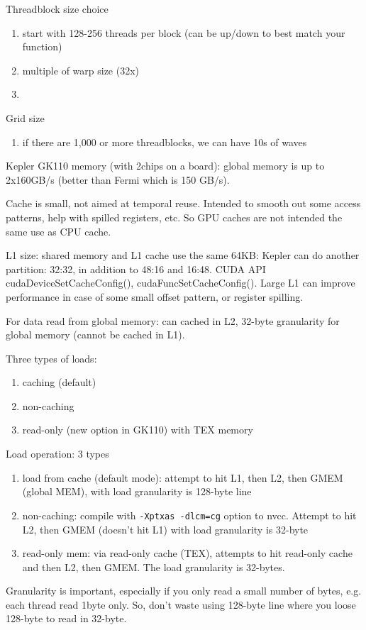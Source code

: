 Threadblock size choice
\begin{enumerate}
  \item start with 128-256 threads per block (can be up/down to best match your
  function)
  \item multiple of warp size (32x)
  \item 
\end{enumerate}

Grid size
\begin{enumerate}
  \item if there are 1,000 or more threadblocks, we can have 10s of waves
\end{enumerate}


Kepler GK110 memory (with 2chips on a board): global memory is up to 2x160GB/s
(better than Fermi which is 150 GB/s).

Cache is small, not aimed at temporal reuse. Intended to smooth out some access
patterns, help with spilled registers, etc. So GPU caches are not intended the
same use as CPU cache. 

L1 size: shared memory and L1 cache use the same 64KB: Kepler can do another
partition: 32:32, in addition to 48:16 and 16:48. CUDA API
cudaDeviceSetCacheConfig(), cudaFuncSetCacheConfig(). Large L1 can improve
performance in case of some small offset pattern, or register spilling. 

For data read from global memory: can cached in L2, 32-byte granularity for
global memory (cannot be cached in L1). 

Three types of loads:
\begin{enumerate}
  \item caching (default)
  \item non-caching
  \item read-only (new option in GK110) with TEX memory
\end{enumerate}

Load operation: 3 types
\begin{enumerate}
  \item load from cache (default mode): attempt to hit L1, then L2, then GMEM
 (global MEM), with load granularity is 128-byte line
 \item non-caching: compile with \verb!-Xptxas -dlcm=cg! option to nvcc. Attempt
 to hit L2, then GMEM (doesn't hit L1) with load granularity is 32-byte 
 \item read-only mem: via read-only cache (TEX), attempts to hit read-only cache
 and then L2, then GMEM. The load granularity is 32-bytes. 
\end{enumerate}
Granularity is important, especially if you only read a small number of bytes,
e.g. each thread read 1byte only. So, don't waste using 128-byte line where you
loose 128-byte to read in 32-byte. 

